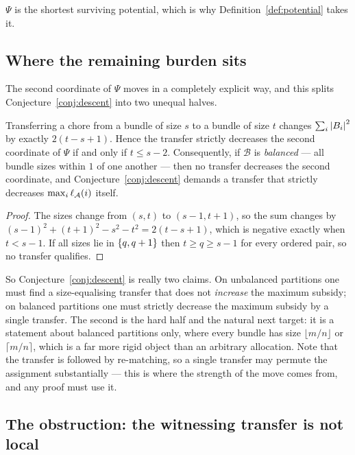 $\Psi$ is the shortest surviving potential, which is why
Definition~\ref{def:potential} takes it.

\subsection{Where the remaining burden sits}

The second coordinate of $\Psi$ moves in a completely explicit way, and this
splits Conjecture~\ref{conj:descent} into two unequal halves.

\begin{lemma}
\label{lem:balance-dichotomy}
Transferring a chore from a bundle of size $s$ to a bundle of size $t$ changes
$\sum_i \left\lvert B_i\right\rvert^2$ by exactly $2(t - s + 1)$. Hence the transfer strictly
decreases the second coordinate of $\Psi$ if and only if $t \le s-2$.
Consequently, if $\mathcal B$ is \emph{balanced} --- all bundle sizes within $1$
of one another --- then no transfer decreases the second coordinate, and
Conjecture~\ref{conj:descent} demands a transfer that strictly decreases
$\max_i \ell_{\mathcal{A}}(i)$ itself.
\end{lemma}

\begin{proof}
The sizes change from $(s,t)$ to $(s-1,t+1)$, so the sum changes by
$(s-1)^2 + (t+1)^2 - s^2 - t^2 = 2(t-s+1)$, which is negative exactly when
$t < s-1$. If all sizes lie in $\left\{q, q+1\right\}$ then $t \ge q \ge s-1$ for every
ordered pair, so no transfer qualifies.
\end{proof}

So Conjecture~\ref{conj:descent} is really two claims. On unbalanced partitions
one must find a size-equalising transfer that does not \emph{increase} the
maximum subsidy; on balanced partitions one must strictly decrease the maximum
subsidy by a single transfer. The second is the hard half and the natural next
target: it is a statement about balanced partitions only, where every bundle has
size $\lfloor m/n \rfloor$ or $\lceil m/n \rceil$, which is a far more rigid object than an
arbitrary allocation. Note that the transfer is followed by re-matching, so a
single transfer may permute the assignment substantially --- this is where the
strength of the move comes from, and any proof must use it.

\subsection{The obstruction: the witnessing transfer is not local}
\label{sec:approach7-obstruction}

